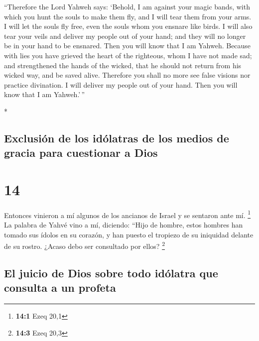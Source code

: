 \begin{paracol}{2}
\begin{otherlanguage}{english}
 ``Therefore the Lord Yahweh says: `Behold, I am against
your magic bands, with which you hunt the souls to make them fly, and I
will tear them from your arms. I will let the souls fly free, even the
souls whom you ensnare like birds.  I will also tear your
veils and deliver my people out of your hand; and they will no longer be
in your hand to be ensnared. Then you will know that I am Yahweh.
 Because with lies you have grieved the heart of the
righteous, whom I have not made sad; and strengthened the hands of the
wicked, that he should not return from his wicked way, and be saved
alive.  Therefore you shall no more see false visions nor
practice divination. I will deliver my people out of your hand. Then you
will know that I am Yahweh.'\,''

\end{otherlanguage}

\switchcolumn[0]*

\hypertarget{exclusiuxf3n-de-los-iduxf3latras-de-los-medios-de-gracia-para-cuestionar-a-dios}{%
\subsection{Exclusión de los idólatras de los medios de gracia para
cuestionar a
Dios}\label{exclusiuxf3n-de-los-iduxf3latras-de-los-medios-de-gracia-para-cuestionar-a-dios}}

\hypertarget{section-26}{%
\section{14}\label{section-26}}

 Entonces vinieron a mí algunos de los ancianos de Israel
y se sentaron ante mí. \footnote{\textbf{14:1} Ezeq 20,1} 
La palabra de Yahvé vino a mí, diciendo:  ``Hijo de
hombre, estos hombres han tomado sus ídolos en su corazón, y han puesto
el tropiezo de su iniquidad delante de su rostro. ¿Acaso debo ser
consultado por ellos? \footnote{\textbf{14:3} Ezeq 20,3}

\hypertarget{el-juicio-de-dios-sobre-todo-iduxf3latra-que-consulta-a-un-profeta}{%
\subsection{El juicio de Dios sobre todo idólatra que consulta a un
profeta}\label{el-juicio-de-dios-sobre-todo-iduxf3latra-que-consulta-a-un-profeta}}


\end{paracol}
